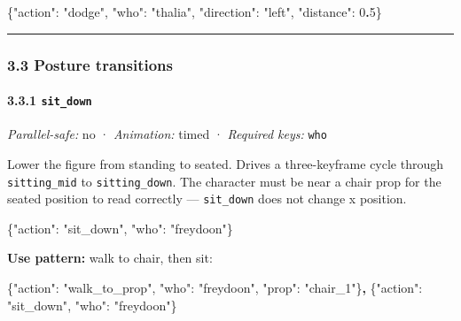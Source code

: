 \documentclass[
  12pt,
  letterpaper,
]{book}
\newenvironment{Shaded}{}{}
\newcommand{\DataTypeTok}[1]{\textcolor[rgb]{0.56,0.13,0.00}{#1}}
\newcommand{\DecValTok}[1]{\textcolor[rgb]{0.25,0.63,0.44}{#1}}
\newcommand{\ErrorTok}[1]{\textcolor[rgb]{1.00,0.00,0.00}{\textbf{#1}}}
\newcommand{\FunctionTok}[1]{\textcolor[rgb]{0.02,0.16,0.49}{#1}}
\newcommand{\StringTok}[1]{\textcolor[rgb]{0.25,0.44,0.63}{#1}}
\begin{document}
\begin{Shaded}
\begin{Highlighting}[]
\FunctionTok{\{}\DataTypeTok{"action"}\FunctionTok{:} \StringTok{"dodge"}\FunctionTok{,} \DataTypeTok{"who"}\FunctionTok{:} \StringTok{"thalia"}\FunctionTok{,} \DataTypeTok{"direction"}\FunctionTok{:} \StringTok{"left"}\FunctionTok{,} \DataTypeTok{"distance"}\FunctionTok{:} \DecValTok{0}\ErrorTok{.}\DecValTok{5}\FunctionTok{\}}
\end{Highlighting}
\end{Shaded}

\begin{center}\rule{0.5\linewidth}{0.5pt}\end{center}

\subsubsection{3.3 Posture transitions}\label{posture-transitions}

\paragraph{\texorpdfstring{3.3.1
\texttt{sit\_down}}{3.3.1 sit\_down}}\label{sit_down}

\emph{Parallel-safe:} no · \emph{Animation:} timed · \emph{Required
keys:} \texttt{who}

Lower the figure from standing to seated. Drives a three-keyframe cycle
through \texttt{sitting\_mid} to \texttt{sitting\_down}. The character
must be near a chair prop for the seated position to read correctly ---
\texttt{sit\_down} does not change x position.

\begin{Shaded}
\begin{Highlighting}[]
\FunctionTok{\{}\DataTypeTok{"action"}\FunctionTok{:} \StringTok{"sit\_down"}\FunctionTok{,} \DataTypeTok{"who"}\FunctionTok{:} \StringTok{"freydoon"}\FunctionTok{\}}
\end{Highlighting}
\end{Shaded}

\textbf{Use pattern:} walk to chair, then sit:

\begin{Shaded}
\begin{Highlighting}[]
\FunctionTok{\{}\DataTypeTok{"action"}\FunctionTok{:} \StringTok{"walk\_to\_prop"}\FunctionTok{,} \DataTypeTok{"who"}\FunctionTok{:} \StringTok{"freydoon"}\FunctionTok{,} \DataTypeTok{"prop"}\FunctionTok{:} \StringTok{"chair\_1"}\FunctionTok{\}}\ErrorTok{,}
\FunctionTok{\{}\DataTypeTok{"action"}\FunctionTok{:} \StringTok{"sit\_down"}\FunctionTok{,} \DataTypeTok{"who"}\FunctionTok{:} \StringTok{"freydoon"}\FunctionTok{\}}
\end{Highlighting}
\end{Shaded}
\end{document}
